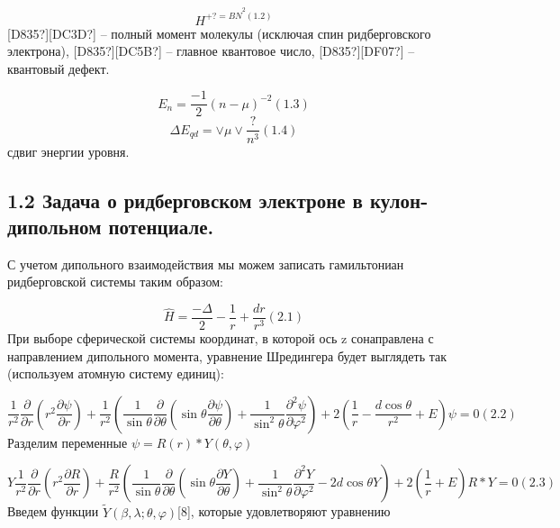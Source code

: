 \documentclass[a4paper]{article}
\begin{document}
\begin{equation*}
H^{+?=B\widehat  N^2(1.2)}
\end{equation*}
\textlatin{[D835?]}\textlatin{[DC3D?]} -- полный
момент молекулы (исключая спин ридберговского
электрона), \textlatin{[D835?]}\textlatin{[DC5B?]} --
главное квантовое
число, \textlatin{[D835?]}\textlatin{[DF07?]} --
квантовый дефект.

\begin{equation*}
E_n=\frac{-1} 2\left(n-\mu \right)^{-2}(1.3)
\end{equation*}
\begin{equation*}
{\Delta}E_{\mathit{qd}}=\vee \mu \vee \frac ?{n^3}(1.4)
\end{equation*}
сдвиг энергии уровня.

\subsection{1.2 Задача о
ридберговском электроне в кулон-дипольном
потенциале.}
\hypertarget{RefHeading4673463868395}{}С учетом
дипольного взаимодействия мы можем записать гамильтониан ридберговской системы таким образом:

\begin{equation*}
\widehat  H=\frac{-{\Delta}} 2-\frac 1 r+\frac{\mathit{dr}}{r^3}(2.1)
\end{equation*}
При выборе сферической системы координат,
в которой ось \foreignlanguage{english}{z}
сонаправлена с направлением дипольного момента, уравнение Шредингера будет выглядеть так (используем атомную систему единиц):

\begin{equation*}
\frac 1{r^2}\frac{{\partial}}{{\partial}r}\left(r^2\frac{{\partial}\psi }{{\partial}r}\right)+\frac 1{r^2}\left(\frac
1{\sin \theta }\frac{{\partial}}{{\partial}\theta }\left(\sin \theta \frac{{\partial}\psi }{{\partial}\theta
}\right)+\frac 1{\sin ^2\theta }\frac{{\partial}^2\psi }{{\partial}\varphi ^2}\right)+2\left(\frac 1 r-\frac{d\cos
\theta }{r^2}+E\right)\psi =0(2.2)
\end{equation*}
Разделим
переменные  $\psi =R\left(r\right)\ast Y(\theta ,\varphi
)$

\begin{equation*}
Y\frac 1{r^2}\frac{{\partial}}{{\partial}r}\left(r^2\frac{{\partial}R}{{\partial}r}\right)+\frac R{r^2}\left(\frac
1{\sin \theta }\frac{{\partial}}{{\partial}\theta }\left(\sin \theta \frac{{\partial}Y}{{\partial}\theta }\right)+\frac
1{\sin ^2\theta }\frac{{\partial}^2Y}{{\partial}\varphi ^2}-2d\cos \theta Y\right)+2\left(\frac 1 r+E\right)R\ast
Y=0(2.3)
\end{equation*}
Введем функции  $\widetilde Y(\beta
,\lambda ;\theta ,\varphi )$[8], которые
удовлетворяют уравнению
\end{document}
